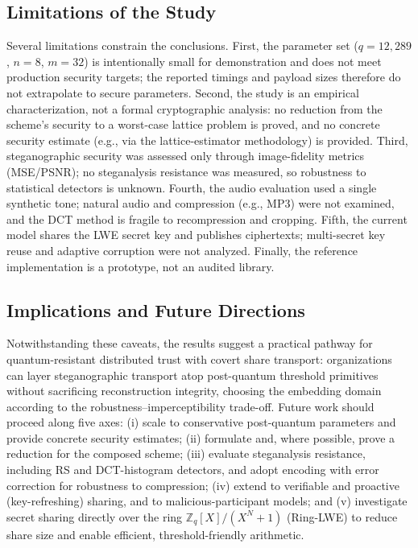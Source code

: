 \documentclass[runningheads]{llncs}
\begin{document}
\subsection{Limitations of the Study}

Several limitations constrain the conclusions. First, the parameter set
($q = 12{,}289$, $n = 8$, $m = 32$) is intentionally small for demonstration and
does not meet production security targets; the reported timings and payload
sizes therefore do not extrapolate to secure parameters. Second, the study is
an empirical characterization, not a formal cryptographic analysis: no
reduction from the scheme's security to a worst-case lattice problem is proved,
and no concrete security estimate (e.g., via the lattice-estimator methodology)
is provided. Third, steganographic security was assessed only through
image-fidelity metrics (MSE/PSNR); no steganalysis resistance was measured, so
robustness to statistical detectors \cite{westfeld2001,fridrich2009} is
unknown. Fourth, the audio evaluation used a single synthetic tone; natural
audio and compression (e.g., MP3) were not examined, and the DCT method is
fragile to recompression and cropping. Fifth, the current model shares the LWE
secret key and publishes ciphertexts; multi-secret key reuse and adaptive
corruption were not analyzed. Finally, the reference implementation is a
prototype, not an audited library.

\subsection{Implications and Future Directions}

Notwithstanding these caveats, the results suggest a practical pathway for
quantum-resistant distributed trust with covert share transport: organizations
can layer steganographic transport atop post-quantum threshold primitives
without sacrificing reconstruction integrity, choosing the embedding domain
according to the robustness--imperceptibility trade-off. Future work should
proceed along five axes: (i) scale to conservative post-quantum parameters and
provide concrete security estimates; (ii) formulate and, where possible, prove
a reduction for the composed scheme; (iii) evaluate steganalysis resistance,
including RS and DCT-histogram detectors, and adopt encoding with error
correction for robustness to compression; (iv) extend to verifiable and
proactive (key-refreshing) sharing, and to malicious-participant models; and
(v) investigate secret sharing directly over the ring
$\mathbb{Z}_q[X]/(X^N+1)$ (Ring-LWE) to reduce share size and enable efficient,
threshold-friendly arithmetic.
\end{document}
